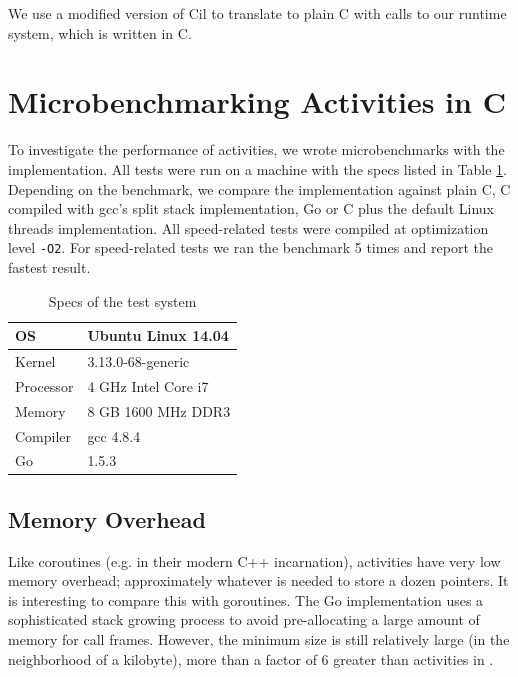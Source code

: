 \documentclass[acmsmall,anonymous,review]{acmart}\settopmatter{printfolios=true,printccs=false,printacmref=false}
\begin{document}
We use a modified version of Cil \cite{Necula2002} to translate \charcoal{} to plain C with calls to our runtime system, which is written in C.

\section{Microbenchmarking Activities in C}

To investigate the performance of activities, we wrote microbenchmarks with the \charcoal{} implementation.
All tests were run on a machine with the specs listed in Table \ref{table:specs}.
Depending on the benchmark, we compare the \charcoal{} implementation against plain C, C compiled with gcc's split stack implementation, Go or C plus the default Linux threads implementation.
All speed-related tests were compiled at optimization level \texttt{-O2}.
For speed-related tests we ran the benchmark 5 times and report the fastest result.

\begin{table}
  \centering
  \begin{tabular}{|l|l|}
    \hline
    OS & Ubuntu Linux 14.04 \\
    \hline
    Kernel & 3.13.0-68-generic \\
    \hline
    Processor & 4 GHz Intel Core i7 \\
    \hline
    Memory & 8 GB 1600 MHz DDR3 \\
    \hline
    Compiler & gcc 4.8.4 \\
    \hline
    Go & 1.5.3 \\
    \hline
  \end{tabular}
  \caption{Specs of the test system}
  \label{table:specs}
\end{table}

\subsection{Memory Overhead}

Like coroutines (e.g. in their modern C++ incarnation), activities have very low memory overhead; approximately whatever is needed to store a dozen pointers.
It is interesting to compare this with goroutines.
The Go implementation uses a sophisticated stack growing process to avoid pre-allocating a large amount of memory for call frames.
However, the minimum size is still relatively large (in the neighborhood of a kilobyte), more than a factor of 6 greater than activities in \charcoal{}.
\end{document}
